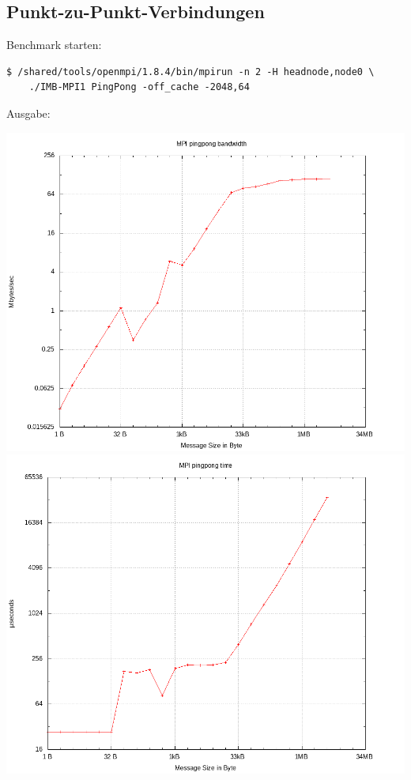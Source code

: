 \subsection{Punkt-zu-Punkt-Verbindungen}
Benchmark starten:
\begin{lstlisting}[style=Bash]
$ /shared/tools/openmpi/1.8.4/bin/mpirun -n 2 -H headnode,node0 \
	./IMB-MPI1 PingPong -off_cache -2048,64
\end{lstlisting}
Ausgabe:

\includegraphics[scale=0.6]{../mpi_benchmark/pingpong_bandwidth.png} 
\newline
\includegraphics[scale=0.6]{../mpi_benchmark/pingpong_time.png}
